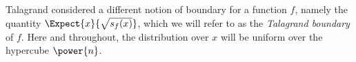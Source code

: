 Talagrand considered a different notion of boundary for a function $f$, namely the quantity $\Expect{x}{\sqrt{s_f(x)}}$, which we will refer to as the \emph{Talagrand boundary} of $f$.
Here and throughout, the distribution over $x$ will be uniform over the hypercube $\power{n}$.
